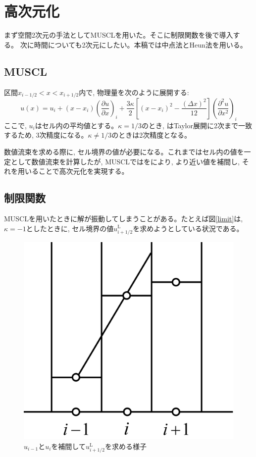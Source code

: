 \documentclass[dvipdfmx,b5paper]{jsarticle}
\begin{document}
\section{高次元化}
まず空間2次元の手法としてMUSCLを用いた。そこに制限関数を後で導入する。
次に時間についても2次元にしたい。本稿では中点法とHeun法を用いる。
\subsection{MUSCL}
区間$x_{i-1/2}<x<x_{i+1/2}$内で, 物理量を次のように展開する: 
\begin{equation}
  u(x)=u_i+(x-x_i)\left(\frac{\partial u}{\partial x}\right)_{i}+\frac{3\kappa}{2}\left[(x-x_i)^2-\frac{(\Delta x)^2}{12}\right]\left(\frac{\partial^2 u}{\partial x^2}\right)_{i}
  \label{muscl}
\end{equation}
ここで, $u_i$はセル内の平均値とする。$\kappa=1/3$のとき, はTaylor展開に2次まで一致するため, 3次精度になる。$\kappa\neq1/3$のときは2次精度となる。

数値流束を求める際に, セル境界の値が必要になる。これまではセル内の値を一定として数値流束を計算したが, MUSCLではをにより, より近い値を補間し, それを用いることで高次元化を実現する。

\subsection{制限関数}
MUSCLを用いたときに解が振動してしまうことがある。たとえば図\ref{limit}は, $\kappa=-1$としたときに, セル境界の値$u_{i+1/2}^{\mathrm{L}}$を求めようとしている状況である。

\begin{figure}[H]
  \centering
  \includegraphics[width = 0.6\linewidth]{fig/limit.png}
  \caption{$u_{i-1}$と$u_i$を補間して$u_{i+1/2}^{\mathrm{L}}$を求める様子}
  \label{fig:limit}
\end{figure}
\end{document}
